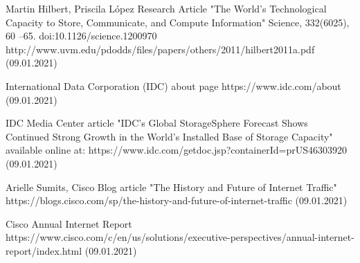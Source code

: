 \documentclass[magisterska,en]{pracamgr}
\begin{document}
\begin{thebibliography}{9}
Martin Hilbert, Priscila López
Research Article "The World’s Technological Capacity to Store, Communicate, and Compute Information" Science, 332(6025), 60 –65. doi:10.1126/science.1200970
http://www.uvm.edu/pdodds/files/papers/others/2011/hilbert2011a.pdf (09.01.2021)

International Data Corporation (IDC) about page
https://www.idc.com/about (09.01.2021)

IDC Media Center article "IDC's Global StorageSphere Forecast Shows Continued Strong Growth in the World's Installed Base of Storage Capacity" available online at: https://www.idc.com/getdoc.jsp?containerId=prUS46303920 (09.01.2021)

Arielle Sumits, Cisco Blog article "The History and Future of Internet Traffic"
https://blogs.cisco.com/sp/the-history-and-future-of-internet-traffic (09.01.2021)

Cisco Annual Internet Report
https://www.cisco.com/c/en/us/solutions/executive-perspectives/annual-internet-report/index.html (09.01.2021)


 
\end{thebibliography}
\end{document}
